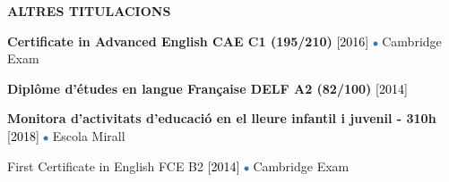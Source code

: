\documentclass[../main.tex]{subfiles}
\begin{document}
    \vspace*{0.5cm}
    \textbf{\textcolor{myCV2}{ALTRES TITULACIONS\underline{\hspace{5.2cm}}}}
        \vspace*{0.3cm}
        
        \textbf{Certificate in Advanced English CAE C1 (195/210)}
        \textcolor{black}{[2016]}
        \includegraphics[width=0.15cm]{assets/full.png} 
        Cambridge Exam
        
        \vspace*{0.25cm}
        \textbf{Diplôme d'études en langue Française DELF A2 (82/100)} 
        \textcolor{black}{[2014]}
        
        \vspace*{0.25cm}
        \textbf{Monitora d'activitats d'educació en el lleure infantil i juvenil - 310h}
        \textcolor{black}{[2018]}
        \includegraphics[width=0.15cm]{assets/full.png} 
        Escola Mirall
        
        \vspace*{0.25cm}
        First Certificate in English FCE B2
        \textcolor{black}{[2014]}
        \includegraphics[width=0.15cm]{assets/full.png} 
        Cambridge Exam 
        

\end{document}
